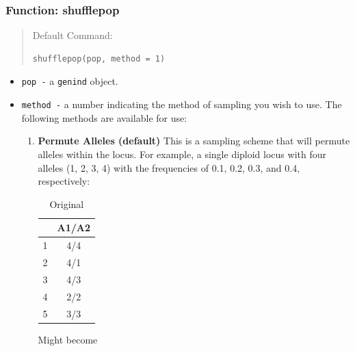 \documentclass[letterpaper]{article}\usepackage[]{graphicx}\usepackage[]{color}
\makeatletter
\newenvironment{kframe}{%
 \def\at@end@of@kframe{}%
 \ifinner\ifhmode%
  \def\at@end@of@kframe{\end{minipage}}%
  \begin{minipage}{\columnwidth}%
 \fi\fi%
 \def\FrameCommand##1{\hskip\@totalleftmargin \hskip-\fboxsep
 \colorbox{shadecolor}{##1}\hskip-\fboxsep
     \hskip-\linewidth \hskip-\@totalleftmargin \hskip\columnwidth}%
 \MakeFramed {\advance\hsize-\width
   \@totalleftmargin\z@ \linewidth\hsize
   \@setminipage}}%
 {\par\unskip\endMakeFramed%
 \at@end@of@kframe}
\newenvironment{knitrout}{}{} %
\makeatother
\begin{document}
\subsubsection{Function: shufflepop}\label{data.manip:shuffle:shufflepop}
\begin{quote}
Default Command:
\begin{knitrout}
\color{fgcolor}\begin{kframe}
\begin{verbatim}
shufflepop(pop, method = 1)
\end{verbatim}
\end{kframe}
\end{knitrout}

\end{quote}
\begin{itemize}
  \item \texttt{pop -} a \texttt{genind} object.
  \item \texttt{method -} a number indicating the method of sampling you wish to use. 
  The following methods are available for use:
  \begin{enumerate}
    \item \textbf{Permute Alleles (default)} This is a sampling scheme that will permute alleles within the locus. For example, a single diploid locus with four alleles (1, 2, 3, 4) with the frequencies of 0.1, 0.2, 0.3, and 0.4, respectively:
\begin{table}[h!]
\centering
\begin{tabular}{lc}
          \hline
            & A1/A2 \\ 
          \hline
          1 & 4/4 \\ 
          2 & 4/1 \\ 
          3 & 4/3 \\ 
          4 & 2/2 \\ 
          5 & 3/3 \\ 
           \hline
        \end{tabular}
        \caption{Original}
        \label{tab:original}
\end{table}
\newpage
Might become
\begin{table}[h!]
\centering
\makebox[0pt][c]{\parbox{\textwidth}{%
}}
\end{table}
\end{enumerate}
\end{itemize}
\end{document}
